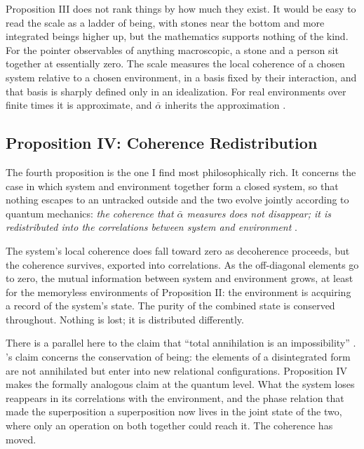 Proposition III does not rank things by how much they exist. It would be easy to read the scale as a ladder of being, with stones near the bottom and more integrated beings higher up, but the mathematics supports nothing of the kind. For the pointer observables of anything macroscopic, a stone and a person sit together at essentially zero. The scale measures the local coherence of a chosen system relative to a chosen environment, in a basis fixed by their interaction, and that basis is sharply defined only in an idealization. For real environments over finite times it is approximate, and $\bar{\alpha}$ inherits the approximation \citep{AdamsRCT, Zurek2003}.

\subsection*{Proposition IV: Coherence Redistribution}

The fourth proposition is the one I find most philosophically rich. It concerns the case in which system and environment together form a closed system, so that nothing escapes to an untracked outside and the two evolve jointly according to quantum mechanics: \emph{the coherence that $\bar{\alpha}$ measures does not disappear; it is redistributed into the correlations between system and environment} \citep{AdamsRCT}.

The system's local coherence does fall toward zero as decoherence proceeds, but the coherence survives, exported into correlations. As the off-diagonal elements go to zero, the mutual information between system and environment grows, at least for the memoryless environments of Proposition II: the environment is acquiring a record of the system's state. The purity of the combined state is conserved throughout. Nothing is lost; it is distributed differently.

There is a parallel here to the \bahai claim that ``total annihilation is an impossibility'' \citep[Talk 38]{PUP}. \AbdulBaha's claim concerns the conservation of being: the elements of a disintegrated form are not annihilated but enter into new relational configurations. Proposition IV makes the formally analogous claim at the quantum level. What the system loses reappears in its correlations with the environment, and the phase relation that made the superposition a superposition now lives in the joint state of the two, where only an operation on both together could reach it. The coherence has moved.

